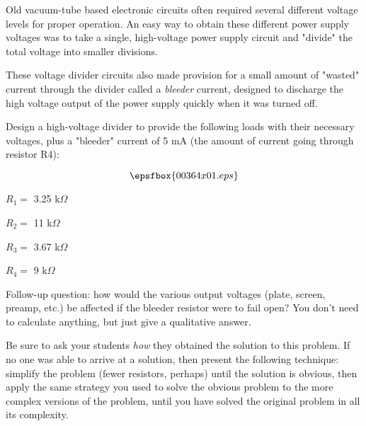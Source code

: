 

Old vacuum-tube based electronic circuits often required several different voltage levels for proper operation.  An easy way to obtain these different power supply voltages was to take a single, high-voltage power supply circuit and "divide" the total voltage into smaller divisions.

These voltage divider circuits also made provision for a small amount of "wasted" current through the divider called a {\it bleeder} current, designed to discharge the high voltage output of the power supply quickly when it was turned off.

Design a high-voltage divider to provide the following loads with their necessary voltages, plus a "bleeder" current of 5 mA (the amount of current going through resistor R4):

$$\epsfbox{00364x01.eps}$$







\item{} $R_1 =$ 3.25 k$\Omega$
\item{} $R_2 =$ 11 k$\Omega$
\item{} $R_3 =$ 3.67 k$\Omega$
\item{} $R_4 =$ 9 k$\Omega$

\vskip 10pt

Follow-up question: how would the various output voltages (plate, screen, preamp, etc.) be affected if the bleeder resistor were to fail open?  You don't need to calculate anything, but just give a qualitative answer.







Be sure to ask your students {\it how} they obtained the solution to this problem.  If no one was able to arrive at a solution, then present the following technique: simplify the problem (fewer resistors, perhaps) until the solution is obvious, then apply the same strategy you used to solve the obvious problem to the more complex versions of the problem, until you have solved the original problem in all its complexity.




